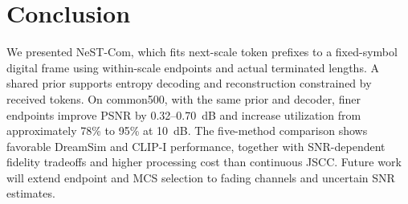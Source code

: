 \section{Conclusion}
We presented NeST-Com, which fits next-scale token prefixes to a fixed-symbol digital frame using within-scale endpoints and actual terminated lengths. A shared prior supports entropy decoding and reconstruction constrained by received tokens. On common500, with the same prior and decoder, finer endpoints improve PSNR by 0.32--0.70~dB and increase utilization from approximately 78\% to 95\% at 10~dB. The five-method comparison shows favorable DreamSim and CLIP-I performance, together with SNR-dependent fidelity tradeoffs and higher processing cost than continuous JSCC. Future work will extend endpoint and MCS selection to fading channels and uncertain SNR estimates.
